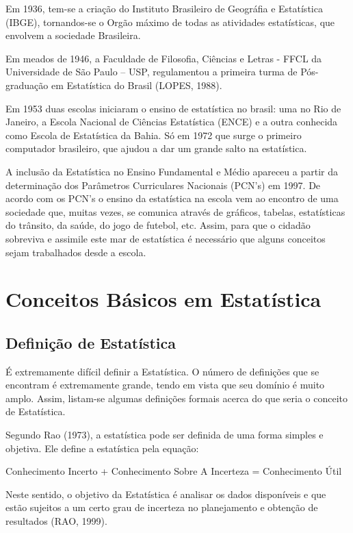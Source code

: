 \inic Em 1936, tem-se a criação do Instituto Brasileiro de Geográfia e Estatística (IBGE), tornandos-se o Orgão máximo de todas as atividades estatísticas, que envolvem a sociedade Brasileira.\vskip0.3cm

\inic Em meados de 1946, a Faculdade de Filosofia, Ciências e Letras - FFCL da Universidade de São Paulo – USP, regulamentou a primeira turma de Pós-graduação em Estatística do Brasil (LOPES, 1988).\vskip0.3cm


\inic Em 1953 duas escolas iniciaram o ensino de estatística no brasil: uma no
Rio de Janeiro, a Escola Nacional de Ciências Estatística (ENCE) e
a outra conhecida como Escola de Estatística da Bahia. Só em 1972
que surge o primeiro computador brasileiro, que ajudou a dar um
grande salto na estatística.\vskip0.3cm


\inic A inclusão da Estatística no Ensino Fundamental e Médio apareceu a
partir da determinação dos Parâmetros Curriculares Nacionais
(PCN's) em 1997. De acordo com os PCN's o ensino da estatística na
escola vem ao encontro de uma sociedade que, muitas vezes, se
comunica através de gráficos, tabelas, estatísticas do trânsito,
da saúde, do jogo de futebol, etc. Assim, para que o cidadão
sobreviva e assimile este mar de estatística é necessário que
alguns conceitos sejam trabalhados desde a escola.


\section{Conceitos Básicos em Estatística}

\subsection{Definição de Estatística}

\inic É extremamente difícil definir a Estatística. O número de definições
que se encontram é extremamente grande, tendo em vista que seu domínio é
muito amplo. Assim, listam-se algumas definições formais acerca do que
seria o conceito de Estatística.\vskip0.3cm

Segundo Rao (1973), a estatística pode ser definida de uma forma
simples e objetiva. Ele define a estatística pela equação:

\begin{center}
Conhecimento Incerto + Conhecimento Sobre A Incerteza =
 Conhecimento Útil
\end{center}

Neste sentido, o objetivo da Estatística é analisar os dados
disponíveis e que estão sujeitos a um certo grau de incerteza no
planejamento e obtenção de resultados (RAO, 1999).\vskip0.3cm


